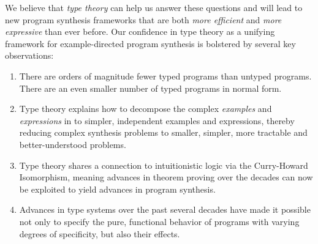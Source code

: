 


  

We believe that \emph{type theory} can help us answer these questions and will lead to
new program synthesis frameworks that are both \emph{more efficient} and
\emph{more expressive} than ever before.  
Our confidence in type theory
as a unifying framework for example-directed program synthesis is bolstered
by several key observations:   

\begin{enumerate}
\item There are orders of magnitude fewer typed programs than
untyped programs.  There are an even smaller number of typed programs in 
normal form.
\item Type theory explains how to decompose the complex 
\emph{examples} and \emph{expressions} in to simpler, 
independent examples and expressions, thereby reducing complex synthesis
problems to smaller, simpler, more tractable and better-understood 
problems.
\item Type theory shares a connection to intuitionistic logic via the
Curry-Howard Isomorphism, meaning advances in theorem proving over the
decades can now be exploited to yield advances in program synthesis.
\item Advances in type systems over the past several decades have made it
possible not only to specify the pure, functional behavior of
programs with varying degrees of specificity, but also their effects.
\end{enumerate}

